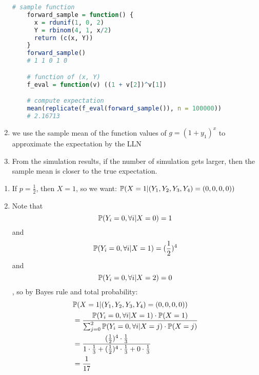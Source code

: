 \documentclass{article}
\begin{document}
\begin{enumerate}
\begin{lstlisting}[language=R]
    # sample function
    forward_sample = function() {
      x = rdunif(1, 0, 2)
      Y = rbinom(4, 1, x/2)
      return (c(x, Y))
    }
    forward_sample()
    # 1 1 0 1 0

    # function of (x, Y)
    f_eval = function(v) ((1 + v[2])^v[1])

    # compute expectation
    mean(replicate(f_eval(forward_sample()), n = 100000))
    # 2.16713
  \end{lstlisting}

  \item we use the sample mean of the function values of $g = (1+y_1)^x$ to approximate the expectation by the LLN
  
  \item From the simulation results, if the number of simulation gets larger, then the sample mean is closer to the true expectation.

  
\end{enumerate}







\begin{enumerate}
\item If $p = \frac12$, then $X = 1$, so we want: $\P(X = 1 | (Y_1, Y_2, Y_3, Y_4) = (0,0,0,0))$
\item Note that 
\[\P(Y_i = 0, \forall i | X = 0) = 1\] and \[\P(Y_i = 0, \forall i | X = 1) = (\frac12)^4\] and \[\P(Y_i = 0, \forall i | X = 2) = 0\] , so by Bayes rule and total probability:
\begin{align*}
& \P(X = 1 | (Y_1, Y_2, Y_3, Y_4) = (0,0,0,0)) \\
& = \frac{\P(Y_i = 0, \forall i | X = 1) \cdot \P(X = 1)}{\sum_{j = 0}^2 \P(Y_i = 0, \forall i | X = j) \cdot \P(X = j)}\\
& = \frac{(\frac12)^4  \cdot \frac13}{1\cdot \frac13 + (\frac12)^4 \cdot \frac13 + 0 \cdot \frac13}\\
& = \frac{1}{17}
\end{align*}
\end{enumerate}
\end{document}
